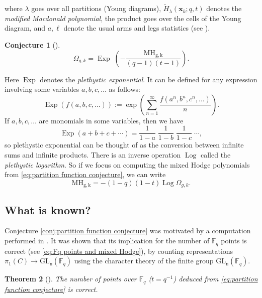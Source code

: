 \documentclass[12pt]{amsart}
\newtheorem{theorem}{Theorem}[section]
\theoremstyle{definition}
\newtheorem{conjecture}[theorem]{Conjecture}
\theoremstyle{remark}
\numberwithin{equation}{section}
\DeclareMathOperator{\pExp}{Exp}
\DeclareMathOperator{\pLog}{Log}
\begin{document}
	where $\lambda$ goes over all partitions (Young diagrams), $\tilde H_\lambda(\mathbf{x}_k;q,t)$ denotes the \emph{modified Macdonald polynomial}, the product goes over the cells of the Young diagram, and $a,\ell$ denote the usual arms and legs statistics (see \cite{garsia1996remarkable}).
	
	\begin{conjecture}[\cite{hausel2011arithmetic}]\label{conj:partition function conjecture}
		\begin{equation}\label{eq:partition function conjecture}
			\Omega_{g,k} = \pExp\;\left(-\frac{\mathrm{MH_{g,k}}}{(q-1)(t-1)}\right).
		\end{equation}
	\end{conjecture}
	
	Here $\pExp$ denotes the \emph{plethystic exponential}. It can be defined for any expression involving some variables $a,b,c,\ldots$ as follows:
	\[
	\pExp(f(a,b,c,\ldots)) := \exp\left(\sum_{n=1}^\infty \frac{f(a^n,b^n,c^n,\ldots)}{n}\right).
	\]
	If $a,b,c,\ldots$ are monomials in some variables, then we have
	\[
	\pExp(a+b+c+\cdots) = \frac{1}{1-a} \; \frac{1}{1-b} \; \frac{1}{1-c} \; \cdots,
	\]
	so plethystic exponential can be thought of as the conversion between infinite sums and infinite products. There is an inverse operation $\pLog$ called the \emph{plethystic logarithm}. So if we focus on computing the mixed Hodge polynomials from \eqref{eq:partition function conjecture}, we can write
	\begin{equation}\label{eq:partition function logarithm}
		\mathrm{MH_{g,k}} = -(1-q)(1-t) \pLog \Omega_{g,k}.
	\end{equation}
	
	\subsection{What is known?}
	Conjecture \eqref{conj:partition function conjecture} was motivated by a computation performed in \cite{hausel2011arithmetic}. It was shown that its implication for the number of $\mathbb{F}_q$ points is correct (see \eqref{eq:Fq points and mixed Hodge}), by counting representations $\pi_1(C)\to \mathrm{GL_n}(\mathbb{F}_q)$ using the character theory of the finite group $\mathrm{GL_n}(\mathbb{F}_q)$.
	\begin{theorem}[\cite{hausel2011arithmetic}]
		The number of points over $\mathbb{F}_q$ ($t=q^{-1}$) deduced from \eqref{eq:partition function conjecture} is correct.
	\end{theorem}
	
\end{document}
